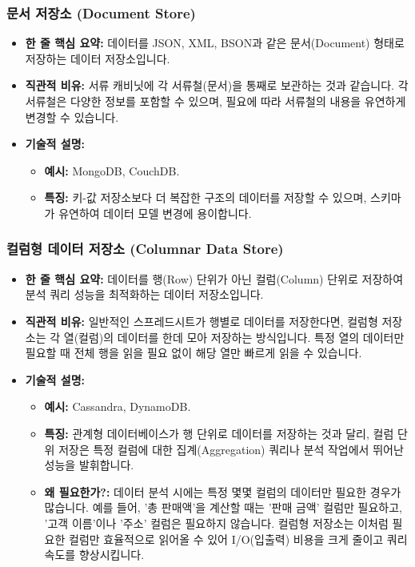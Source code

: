 \documentclass[11pt,a4paper]{article}
\theoremstyle{definition}
\begin{document}
\subsubsection{문서 저장소 (Document Store)}
\begin{itemize}
    \item \textbf{한 줄 핵심 요약:} 데이터를 JSON, XML, BSON과 같은 문서(Document) 형태로 저장하는 데이터 저장소입니다.
    \item \textbf{직관적 비유:} 서류 캐비닛에 각 서류철(문서)을 통째로 보관하는 것과 같습니다. 각 서류철은 다양한 정보를 포함할 수 있으며, 필요에 따라 서류철의 내용을 유연하게 변경할 수 있습니다.
    \item \textbf{기술적 설명:}
    \begin{itemize}
        \item \textbf{예시:} MongoDB, CouchDB.
        \item \textbf{특징:} 키-값 저장소보다 더 복잡한 구조의 데이터를 저장할 수 있으며, 스키마가 유연하여 데이터 모델 변경에 용이합니다.
    \end{itemize}
\end{itemize}

\subsubsection{컬럼형 데이터 저장소 (Columnar Data Store)}
\begin{itemize}
    \item \textbf{한 줄 핵심 요약:} 데이터를 행(Row) 단위가 아닌 컬럼(Column) 단위로 저장하여 분석 쿼리 성능을 최적화하는 데이터 저장소입니다.
    \item \textbf{직관적 비유:} 일반적인 스프레드시트가 행별로 데이터를 저장한다면, 컬럼형 저장소는 각 열(컬럼)의 데이터를 한데 모아 저장하는 방식입니다. 특정 열의 데이터만 필요할 때 전체 행을 읽을 필요 없이 해당 열만 빠르게 읽을 수 있습니다.
    \item \textbf{기술적 설명:}
    \begin{itemize}
        \item \textbf{예시:} Cassandra, DynamoDB.
        \item \textbf{특징:} 관계형 데이터베이스가 행 단위로 데이터를 저장하는 것과 달리, 컬럼 단위 저장은 특정 컬럼에 대한 집계(Aggregation) 쿼리나 분석 작업에서 뛰어난 성능을 발휘합니다.
    \item \textbf{왜 필요한가?:} 데이터 분석 시에는 특정 몇몇 컬럼의 데이터만 필요한 경우가 많습니다. 예를 들어, '총 판매액'을 계산할 때는 '판매 금액' 컬럼만 필요하고, '고객 이름'이나 '주소' 컬럼은 필요하지 않습니다. 컬럼형 저장소는 이처럼 필요한 컬럼만 효율적으로 읽어올 수 있어 I/O(입출력) 비용을 크게 줄이고 쿼리 속도를 향상시킵니다.
    \end{itemize}
\end{itemize}
\end{document}
